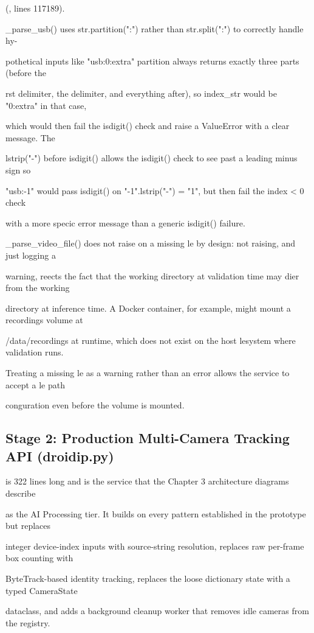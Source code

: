 (, lines 117189).

\_parse\_usb() uses str.partition(":") rather than str.split(":") to correctly handle hy-

pothetical inputs like "usb:0:extra"  partition always returns exactly three parts (before the

rst delimiter, the delimiter, and everything after), so index\_str would be "0:extra" in that case,

which would then fail the isdigit() check and raise a ValueError with a clear message. The

lstrip("-") before isdigit() allows the isdigit() check to see past a leading minus sign  so

"usb:-1" would pass isdigit() on "-1".lstrip("-") = "1", but then fail the index < 0 check

with a more specic error message than a generic isdigit() failure.

\_parse\_video\_file() does not raise on a missing le by design: not raising, and just logging a

warning, reects the fact that the working directory at validation time may dier from the working

directory at inference time. A Docker container, for example, might mount a recordings volume at

/data/recordings at runtime, which does not exist on the host lesystem where validation runs.

Treating a missing le as a warning rather than an error allows the service to accept a le path

conguration even before the volume is mounted.


\subsection{Stage 2: Production Multi-Camera Tracking API (droidip.py)}
is 322 lines long and is the service that the Chapter 3 architecture diagrams describe

as the AI Processing tier. It builds on every pattern established in the prototype but replaces

integer device-index inputs with source-string resolution, replaces raw per-frame box counting with

ByteTrack-based identity tracking, replaces the loose dictionary state with a typed CameraState

dataclass, and adds a background cleanup worker that removes idle cameras from the registry.

